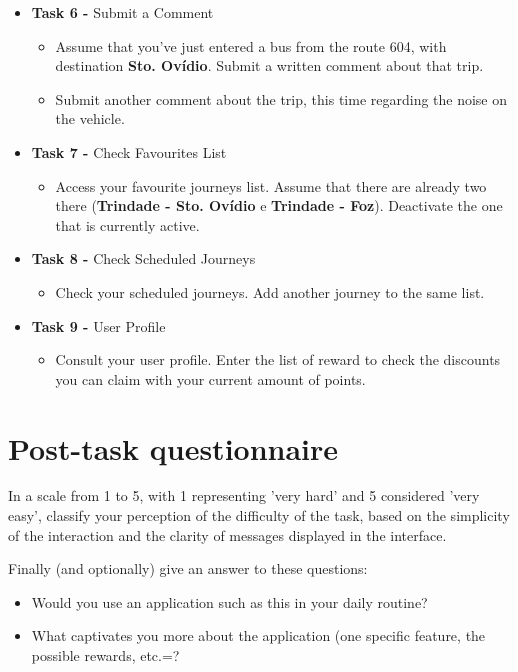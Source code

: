 \begin{itemize}
\item \textbf{Task 6 -} Submit a Comment

\begin{itemize}
\item Assume that you've just entered a bus from the route 604, with destination \textbf{Sto. Ovídio}. Submit a written comment about that trip.

\item Submit another comment about the trip, this time regarding the noise on the vehicle.
\end{itemize}

\item \textbf{Task 7 -} Check Favourites List

\begin{itemize}
\item Access your favourite journeys list. Assume that there are already two there (\textbf{Trindade - Sto. Ovídio} e \textbf{Trindade - Foz}). Deactivate the one that is currently active.
\end{itemize}

\item \textbf{Task 8 -} Check Scheduled Journeys

\begin{itemize}
\item Check your scheduled journeys. Add another journey to the same list.
\end{itemize}

\item \textbf{Task 9 -} User Profile

\begin{itemize}
\item Consult your user profile. Enter the list of reward to check the discounts you can claim with your current amount of points.
\end{itemize}

\end{itemize}


\section{Post-task questionnaire}

In a scale from 1 to 5, with 1 representing 'very hard' and 5 considered 'very easy', classify your perception of the difficulty of the task, based on the simplicity of the interaction and the clarity of messages displayed in the interface.

Finally (and optionally) give an answer to these questions:

\begin{itemize}
\item Would you use an application such as this in your daily routine?
\item What captivates you more about the application (one specific feature, the possible rewards, etc.=?
\end{itemize}